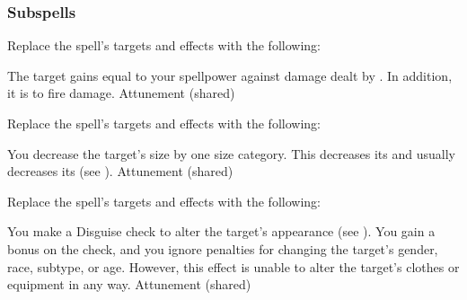 \subsubsection{Subspells}
Replace the spell's targets and effects with the following:
\begin{spellcontent}
\begin{augmenttargetinginfo}
\end{augmenttargetinginfo}
\begin{augmenteffects}
\spelleffect
The target gains  equal to your spellpower against damage dealt by .
In addition, it is  to fire damage.
\spelldur Attunement (shared)
\end{augmenteffects}
\end{spellcontent}
Replace the spell's targets and effects with the following:
\begin{spellcontent}
\begin{augmenttargetinginfo}
\end{augmenttargetinginfo}
\begin{augmenteffects}
\spelleffect
You decrease the target's size by one size category.
This decreases its  and usually decreases its  (see ).
\spelldur Attunement (shared)
\end{augmenteffects}
\end{spellcontent}
Replace the spell's targets and effects with the following:
\begin{spellcontent}
\begin{augmenttargetinginfo}
\end{augmenttargetinginfo}
\begin{augmenteffects}
\spelleffect
You make a Disguise check to alter the target's appearance (see ).
You gain a  bonus on the check, and you ignore penalties for changing the target's gender, race, subtype, or age.
However, this effect is unable to alter the target's clothes or equipment in any way.
\spelldur Attunement (shared)
\end{augmenteffects}
\end{spellcontent}
